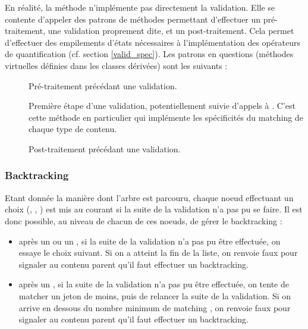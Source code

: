 En réalité, la méthode  n'implémente pas directement la validation. Elle se contente d'appeler des patrons de méthodes permettant d'effectuer un pré-traitement, une validation proprement dite, et un post-traitement. Cela permet d'effectuer des empilements d'états nécessaires à l'implémentation des opérateurs de quantification (cf. section \ref{valid_spec}). Les patrons en questions (méthodes virtuelles définies dans les classes dérivées) sont les suivants :
\begin{description}
\item[] Pré-traitement précédant une validation.
\item[] Première étape d'une validation, potentiellement suivie d'appels à . C'est cette méthode en particulier qui implémente les spécificités du \og matching \fg de chaque type de contenu.
\item[] Post-traitement précédant une validation.
\end{description}

\subsubsection{Backtracking}
Etant donnée la manière dont l'arbre est parcouru, chaque noeud effectuant un choix (, , ) est mis au courant si la suite de la validation n'a pas pu se faire. Il est donc possible, au niveau de chacun de ces noeuds, de gérer le backtracking :
\begin{itemize}
\item après un  ou un , si la suite de la validation n'a pas pu être effectuée, on essaye le choix suivant. Si on a atteint la fin de la liste, on renvoie faux pour signaler au contenu parent qu'il faut effectuer un backtracking.
\item après un , si la suite de la validation n'a pas pu être effectuée, on tente de \og matcher \fg un jeton de moins, puis de relancer la suite de la validation. Si on arrive en dessous du nombre minimum de \og matching \fg, on renvoie faux pour signaler au contenu parent qu'il faut effectuer un backtracking.
\end{itemize}

